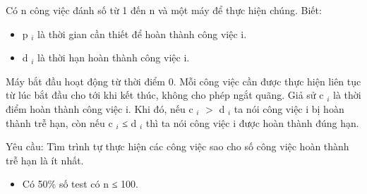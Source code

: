 Có n công việc đánh số từ 1 đến n và một máy để thực hiện chúng. Biết:  
\begin{itemize}
	\item     p    $_     i    $    là thời gian cần thiết để hoàn thành công việc i.   
	\item     d    $_     i    $    là thời hạn hoàn thành công việc i.   
\end{itemize}

   Máy bắt đầu hoạt động từ thời điểm 0. Mỗi công việc cần được thực hiện liên tục từ lúc bắt đầu cho tới khi kết thúc, không cho phép ngắt quãng. Giả sử c   $_    i   $   là thời điểm hoàn thành công việc i. Khi đó, nếu c   $_    i   $   $>$  d   $_    i   $   ta nói công việc i bị hoàn thành trễ hạn, còn nếu  c   $_    i   $   ≤ d   $_    i   $   thì ta nói công việc i được hoàn thành đúng hạn.  

   Yêu cầu: Tìm trình tự thực hiện các công việc sao cho số công việc hoàn thành trễ hạn là ít nhất.  

\begin{itemize}
	\item     Có 50\% số test có n ≤ 100.   
\end{itemize}